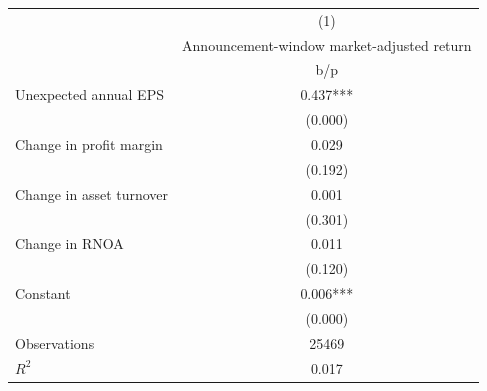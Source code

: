 {
\def\sym#1{\ifmmode^{#1}\else\(^{#1}\)\fi}
\begin{tabular}{l*{1}{c}}
\hline\hline
                    &\multicolumn{1}{c}{(1)}\\
                    &\multicolumn{1}{c}{Announcement-window market-adjusted return}\\
                    &         b/p   \\
\hline
Unexpected annual EPS&       0.437***\\
                    &     (0.000)   \\
Change in profit margin&       0.029   \\
                    &     (0.192)   \\
Change in asset turnover&       0.001   \\
                    &     (0.301)   \\
Change in RNOA      &       0.011   \\
                    &     (0.120)   \\
Constant            &       0.006***\\
                    &     (0.000)   \\
\hline
Observations        &       25469   \\
\(R^{2}\)           &       0.017   \\
\hline\hline
\end{tabular}
}

